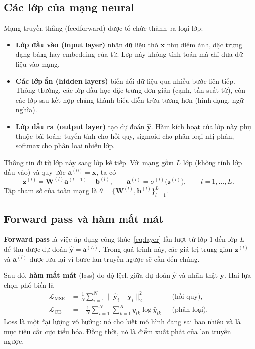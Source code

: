 \documentclass[12pt]{article}
\begin{document}
\subsection{Các lớp của mạng neural}
Mạng truyền thẳng (feedforward) được tổ chức thành ba loại lớp:
\begin{itemize}
    \item \textbf{Lớp đầu vào (input layer)} nhận dữ liệu thô $\mathbf{x}$ như điểm ảnh, đặc trưng dạng bảng hay embedding của từ. Lớp này không tính toán mà chỉ đưa dữ liệu vào mạng.
    \item \textbf{Các lớp ẩn (hidden layers)} biến đổi dữ liệu qua nhiều bước liên tiếp. Thông thường, các lớp đầu học đặc trưng đơn giản (cạnh, tần suất từ), còn các lớp sau kết hợp chúng thành biểu diễn trừu tượng hơn (hình dạng, ngữ nghĩa).
    \item \textbf{Lớp đầu ra (output layer)} tạo dự đoán $\hat{\mathbf{y}}$. Hàm kích hoạt của lớp này phụ thuộc bài toán: tuyến tính cho hồi quy, sigmoid cho phân loại nhị phân, softmax cho phân loại nhiều lớp.
\end{itemize}

Thông tin đi từ lớp này sang lớp kế tiếp. Với mạng gồm $L$ lớp (không tính lớp đầu vào) và quy ước $\mathbf{a}^{(0)}=\mathbf{x}$, ta có
\begin{equation}
    \mathbf{z}^{(l)}=\mathbf{W}^{(l)}\mathbf{a}^{(l-1)}+\mathbf{b}^{(l)},
    \qquad
    \mathbf{a}^{(l)}=\sigma^{(l)}\!\bigl(\mathbf{z}^{(l)}\bigr),
    \qquad l=1,\dots,L.
    \label{eq:layer}
\end{equation}
Tập tham số của toàn mạng là $\theta=\{\mathbf{W}^{(l)},\mathbf{b}^{(l)}\}_{l=1}^{L}$.

\subsection{Forward pass và hàm mất mát}
\textbf{Forward pass} là việc áp dụng công thức~\eqref{eq:layer} lần lượt từ lớp $1$ đến lớp $L$ để thu được dự đoán $\hat{\mathbf{y}}=\mathbf{a}^{(L)}$. Trong quá trình này, các giá trị trung gian $\mathbf{z}^{(l)}$ và $\mathbf{a}^{(l)}$ được lưu lại vì bước lan truyền ngược sẽ cần đến chúng.

Sau đó, \textbf{hàm mất mát} (loss) đo độ lệch giữa dự đoán $\hat{\mathbf{y}}$ và nhãn thật $\mathbf{y}$. Hai lựa chọn phổ biến là
\begin{align}
    \mathcal{L}_{\mathrm{MSE}} &= \frac{1}{N}\sum_{i=1}^{N}\bigl\lVert \hat{\mathbf{y}}_i-\mathbf{y}_i\bigr\rVert_2^{2}
    && \text{(hồi quy)}, \\
    \mathcal{L}_{\mathrm{CE}} &= -\frac{1}{N}\sum_{i=1}^{N}\sum_{k=1}^{K} y_{ik}\log\hat{y}_{ik}
    && \text{(phân loại)}.
\end{align}
Loss là một đại lượng vô hướng: nó cho biết mô hình đang sai bao nhiêu và là mục tiêu cần cực tiểu hóa. Đồng thời, nó là điểm xuất phát của lan truyền ngược.
\end{document}
